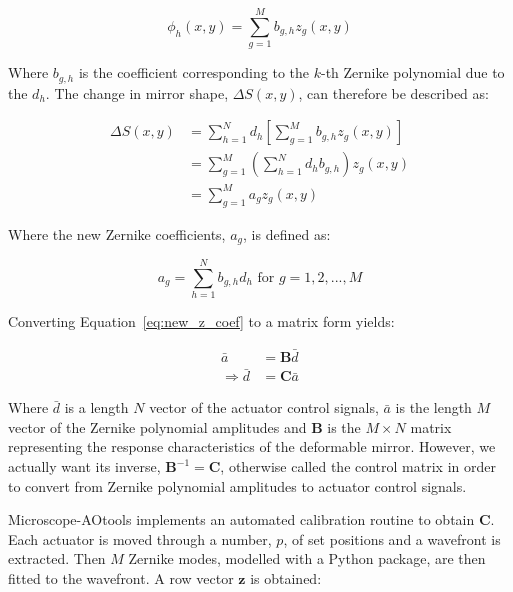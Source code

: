 \begin{equation}\label{eq:influence_to_zernike}
\phi_{h}(x,y) = \sum_{g=1}^{M} b_{g,h}z_{g}(x,y)
\end{equation}

Where $b_{g,h}$ is the coefficient corresponding to the $k$-th Zernike polynomial due to the $d_h$. The change in mirror shape, $\Delta S(x,y)$, can therefore be described as:

\begin{equation}\label{eq:zernike_sub}
\begin{split}
\Delta S(x,y) & = \sum_{h=1}^{N} d_{h}\left[\sum_{g=1}^{M} b_{g,h}z_{g}(x,y)\right] \\
& =\sum_{g=1}^{M} \left(\sum_{h=1}^{N} d_{h} b_{g,h}\right) z_{g}(x,y) \\
& =\sum_{g=1}^{M} a_{g} z_{g}(x,y)
\end{split}
\end{equation}

Where the new Zernike coefficients, $a_{g}$, is defined as:

\begin{equation}\label{eq:new_z_coef}
a_{g} = \sum_{h=1}^{N} b_{g,h} d_{h} \text{~for~} g=1,2,...,M
\end{equation}

Converting Equation~\ref{eq:new_z_coef} to a matrix form yields:

\begin{equation}\label{eq:CM_derivation}
\begin{split}
\bar{a} &= \boldsymbol{B} \bar{d}\\
\Rightarrow \bar{d} &= \boldsymbol{C} \bar{a}
\end{split}
\end{equation}

Where $\bar{d}$ is a length $N$ vector of the actuator control signals, $\bar{a}$ is the length $M$ vector of the Zernike polynomial amplitudes and $\boldsymbol{B}$ is the $M \times N$ matrix representing the response characteristics of the deformable mirror. However, we actually want its inverse, $\boldsymbol{B}^{-1} =\boldsymbol{C}$, otherwise called the control matrix in order to convert from Zernike polynomial amplitudes to actuator control signals.

Microscope-AOtools implements an automated calibration routine to obtain $\boldsymbol{C}$. Each actuator is moved through a number, $p$, of set positions and a wavefront is extracted. Then $M$ Zernike modes, modelled with a Python package, are then fitted to the wavefront\cite{townson2019aotools}. A row vector $\boldsymbol{z}$ is obtained:

